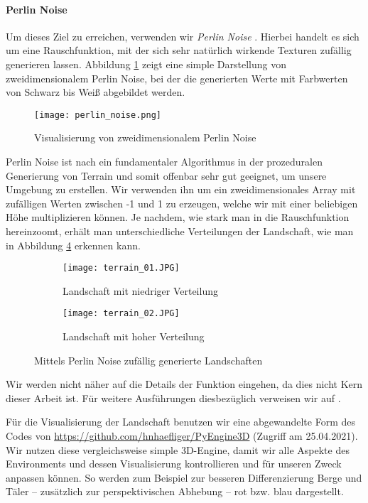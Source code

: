 \paragraph{Perlin Noise}
Um dieses Ziel zu erreichen, verwenden wir \textit{Perlin Noise} \cite{parberry2015modeling}. Hierbei handelt es sich um eine Rauschfunktion, mit der sich sehr natürlich wirkende Texturen zufällig generieren lassen. Abbildung \ref{img:perlinNoise} zeigt eine simple Darstellung von zweidimensionalem Perlin Noise, bei der die generierten Werte mit Farbwerten von Schwarz bis Weiß abgebildet werden.
\begin{figure}[h!]
    \centering
    \texttt{[image: perlin\_noise.png]}
    \caption{Visualisierung von zweidimensionalem Perlin Noise} \label{img:perlinNoise}
\end{figure}
Perlin Noise ist nach \cite{parberry2015modeling} ein fundamentaler Algorithmus in der prozeduralen Generierung von Terrain und somit offenbar sehr gut geeignet, um unsere Umgebung zu erstellen. Wir verwenden ihn um ein zweidimensionales Array mit zufälligen Werten zwischen -1 und 1 zu erzeugen, welche wir mit einer beliebigen Höhe multiplizieren können. Je nachdem, wie stark man in die Rauschfunktion \glqq hereinzoomt\grqq{}, erhält man unterschiedliche Verteilungen der Landschaft, wie man in Abbildung \ref{img:randomTerrain} erkennen kann.
\begin{figure}[h!]
    \centering
    \begin{subfigure}[b]{0.49\textwidth}
        \texttt{[image: terrain\_01.JPG]}
        \caption{Landschaft mit niedriger Verteilung}
        \label{img:randomTerrainA}
    \end{subfigure}
    \begin{subfigure}[b]{0.49\textwidth}
        \texttt{[image: terrain\_02.JPG]}
        \caption{Landschaft mit hoher Verteilung}
        \label{img:randomTerrainB}
    \end{subfigure}
    \caption{Mittels Perlin Noise zufällig generierte Landschaften}
    \label{img:randomTerrain}
\end{figure}
Wir werden nicht näher auf die Details der Funktion eingehen, da dies nicht Kern dieser Arbeit ist. Für weitere Ausführungen diesbezüglich verweisen wir auf \cite{archer2011procedurally}.

Für die Visualisierung der Landschaft benutzen wir eine abgewandelte Form des Codes von \url{https://github.com/hnhaefliger/PyEngine3D} (Zugriff am 25.04.2021). Wir nutzen diese vergleichsweise simple 3D-Engine, damit wir alle Aspekte des Environments und dessen Visualisierung kontrollieren und für unseren Zweck anpassen können. So werden zum Beispiel zur besseren Differenzierung Berge und Täler -- zusätzlich zur perspektivischen Abhebung -- rot bzw. blau dargestellt.

